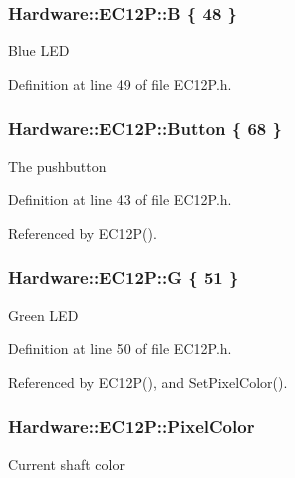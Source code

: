 \subsubsection[{B}]{ Hardware\+::\+E\+C12\+P\+::\+B \{ 48 \}\hspace{0.3cm}{\ttfamily [private]}}\label{class_hardware_1_1_e_c12_p_a326f00b2047ecb58ee1e7e894dc61ad3}
Blue L\+E\+D 

Definition at line 49 of file E\+C12\+P.\+h.

\hypertarget{class_hardware_1_1_e_c12_p_a6d91a7b1767f080af8c33bacdae1dd1d}{}
\subsubsection[{Button}]{ Hardware\+::\+E\+C12\+P\+::\+Button \{ 68 \}}\label{class_hardware_1_1_e_c12_p_a6d91a7b1767f080af8c33bacdae1dd1d}
The pushbutton 

Definition at line 43 of file E\+C12\+P.\+h.



Referenced by E\+C12\+P().

\hypertarget{class_hardware_1_1_e_c12_p_a7afd63c14e12d861c8b20614ef34d70e}{}
\subsubsection[{G}]{ Hardware\+::\+E\+C12\+P\+::\+G \{ 51 \}\hspace{0.3cm}{\ttfamily [private]}}\label{class_hardware_1_1_e_c12_p_a7afd63c14e12d861c8b20614ef34d70e}
Green L\+E\+D 

Definition at line 50 of file E\+C12\+P.\+h.



Referenced by E\+C12\+P(), and Set\+Pixel\+Color().

\hypertarget{class_hardware_1_1_e_c12_p_a1bc6223c152c6d9f30304b92069f05c0}{}
\subsubsection[{Pixel\+Color}]{ Hardware\+::\+E\+C12\+P\+::\+Pixel\+Color\hspace{0.3cm}{\ttfamily [private]}}\label{class_hardware_1_1_e_c12_p_a1bc6223c152c6d9f30304b92069f05c0}
Current shaft color 

